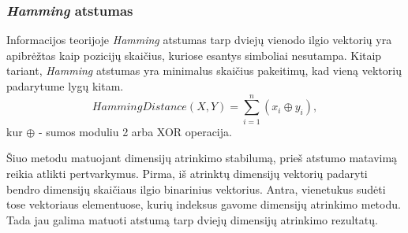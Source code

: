 \subsubsection{\textit{Hamming} atstumas}

Informacijos teorijoje \textit{Hamming} atstumas \cite{hamming1950error} tarp dviejų vienodo ilgio vektorių yra apibrėžtas kaip pozicijų skaičius, kuriose esantys simboliai nesutampa. Kitaip tariant, \textit{Hamming} atstumas yra minimalus skaičius pakeitimų, kad vieną vektorių padarytume lygų kitam. 
\begin{equation}
\label{hamming_distance}
 Hamming Distance(X, Y)= \sum_{i=1}^{n} (x_i \oplus y_i),
\end{equation}
kur $\oplus$ - sumos moduliu 2 arba XOR operacija.

Šiuo metodu matuojant dimensijų atrinkimo stabilumą, prieš atstumo matavimą reikia atlikti pertvarkymus. Pirma, iš atrinktų dimensijų vektorių padaryti bendro dimensijų skaičiaus ilgio binarinius vektorius. Antra, vienetukus sudėti tose vektoriaus elementuose, kurių indeksus gavome dimensijų atrinkimo metodu. Tada jau galima matuoti atstumą tarp dviejų dimensijų atrinkimo rezultatų.
